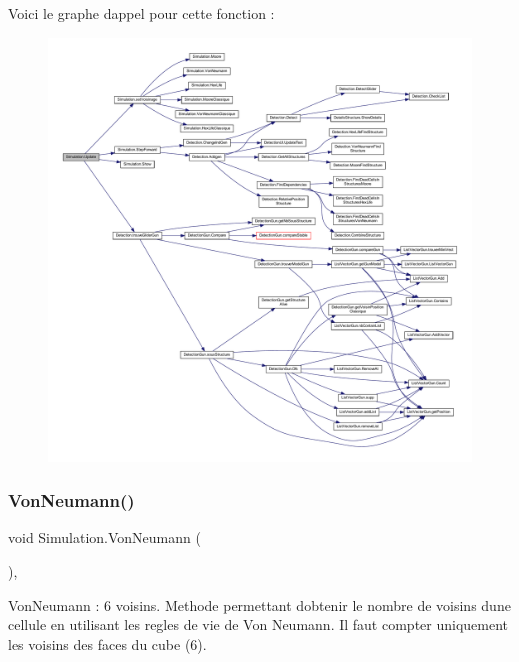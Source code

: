 Voici le graphe d\textquotesingle{}appel pour cette fonction \+:
\nopagebreak
\begin{figure}[H]
\begin{center}
\leavevmode
\includegraphics[width=350pt]{class_simulation_a8486cde41c003277c1ac75fffeda973b_cgraph}
\end{center}
\end{figure}
\mbox{\label{class_simulation_af23614524fe3045d198d953f09264f79}} 
\subsubsection{\texorpdfstring{Von\+Neumann()}{VonNeumann()}}
{\footnotesize\ttfamily void Simulation.\+Von\+Neumann (\begin{DoxyParamCaption}{ }\end{DoxyParamCaption})\hspace{0.3cm}{\ttfamily [inline]}, {\ttfamily [private]}}



Von\+Neumann \+: 6 voisins. Methode permettant d\textquotesingle{}obtenir le nombre de voisins d\textquotesingle{}une cellule en utilisant les regles de vie de Von Neumann. Il faut compter uniquement les voisins des faces du cube (6). 

